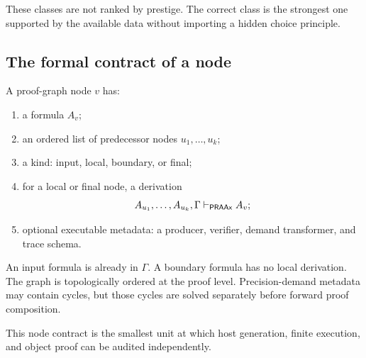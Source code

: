 These classes are not ranked by prestige.  The correct class is the strongest one supported by the available data without importing a hidden choice principle.

\subsection{The formal contract of a node}

A proof-graph node \(v\) has:
\begin{enumerate}
\item a formula \(A_v\);
\item an ordered list of predecessor nodes \(u_1,\ldots,u_k\);
\item a kind: input, local, boundary, or final;
\item for a local or final node, a derivation
\[
 A_{u_1},\ldots,A_{u_k},\Gamma\vdash_{\mathsf{PRAAx}} A_v;
\]
\item optional executable metadata: a producer, verifier, demand transformer, and trace schema.
\end{enumerate}
An input formula is already in \(\Gamma\).  A boundary formula has no local derivation.  The graph is topologically ordered at the proof level.  Precision-demand metadata may contain cycles, but those cycles are solved separately before forward proof composition.

This node contract is the smallest unit at which host generation, finite execution, and object proof can be audited independently.
